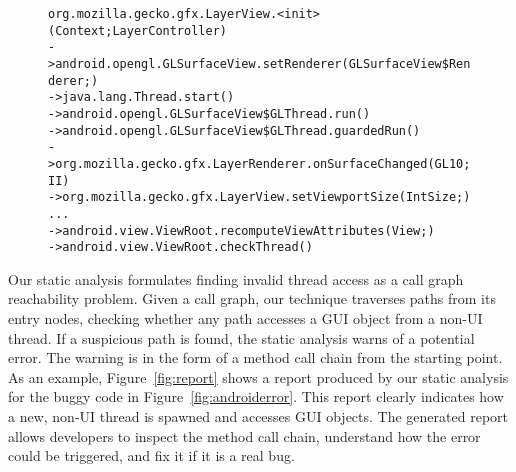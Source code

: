 \begin{figure}[t]
\begin{CodeOut}
\begin{alltt}
   org.mozilla.gecko.gfx.LayerView.<init>(Context;LayerController)
-> android.opengl.GLSurfaceView.setRenderer(GLSurfaceView\$Renderer;)
-> java.lang.Thread.start()
-> android.opengl.GLSurfaceView\$GLThread.run()
-> android.opengl.GLSurfaceView\$GLThread.guardedRun()
-> org.mozilla.gecko.gfx.LayerRenderer.onSurfaceChanged(GL10;II)
-> org.mozilla.gecko.gfx.LayerView.setViewportSize(IntSize;)
   ... 
-> android.view.ViewRoot.recomputeViewAttributes(View;)
-> android.view.ViewRoot.checkThread()
\end{alltt}
\end{CodeOut}
\vspace*{-15pt}
\end{figure}

Our static analysis formulates finding invalid thread access as a call graph reachability
problem. Given a call graph, our technique traverses
paths from its entry nodes, checking whether
any path accesses a GUI object from a non-UI thread. If 
a suspicious path is found, the static analysis warns of a potential error.
The warning is in the form of a method
call chain from the starting point.
As an example, Figure~\ref{fig:report} shows a report produced
by our static analysis for the buggy code in Figure~\ref{fig:androiderror}.
This report clearly indicates how a new, non-UI thread is spawned and
accesses GUI objects. The generated report allows  developers to
inspect the method call chain, understand how the error
could be triggered, and fix it if it is a real bug.

